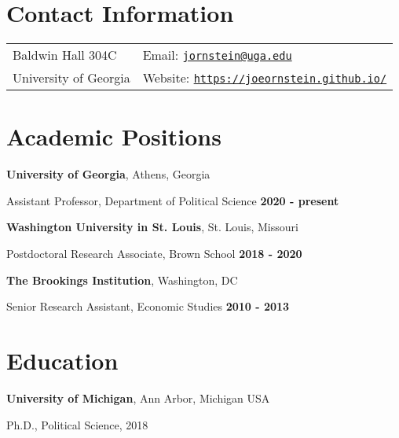 \documentclass[margin,line]{res}
\newenvironment{list1}{
  \begin{list}{}{%
      \setlength{\itemsep}{0.1in}
      \setlength{\parsep}{0in} \setlength{\parskip}{0in}
      \setlength{\topsep}{0.1in} \setlength{\partopsep}{0in} 
      \setlength{\leftmargin}{0.17in}}}{\end{list}}
\newenvironment{list2}{
  \begin{list}{$\bullet$}{%
      \setlength{\itemsep}{0in}
      \setlength{\parsep}{0in} \setlength{\parskip}{0in}
      \setlength{\topsep}{0in} \setlength{\partopsep}{0in} 
      \setlength{\leftmargin}{0.2in}}}{\end{list}}
\begin{document}

\begin{resume}
	
\section{\sc Contact Information}
\vspace{.05in}
\begin{tabular}{@{}p{2in}p{4in}}   
Baldwin Hall 304C & Email: \href{mailto:jornstein@uga.edu}{\tt jornstein@uga.edu}\\       
University of Georgia & Website: \href{https://joeornstein.github.io/}{\tt https://joeornstein.github.io/}\\
\end{tabular}


\section{\sc Academic Positions}

{\bf University of Georgia}, Athens, Georgia
\begin{list1}
	\item[] Assistant Professor, Department of Political Science \hfill {\bf 2020 - present}
\end{list1}

{\bf Washington University in St. Louis}, St. Louis, Missouri
\begin{list1}
	\item[] Postdoctoral Research Associate, Brown School \hfill {\bf 2018 - 2020}
\end{list1}

{\bf The Brookings Institution}, Washington, DC
\begin{list1}
	\item[] Senior Research Assistant, Economic Studies \hfill {\bf 2010 - 2013}
\end{list1}



\section{\sc Education}
{\bf University of Michigan}, Ann Arbor, Michigan USA
\begin{list1}
\item[] Ph.D., Political Science, 2018
\end{list1}


\end{resume}
\end{document}
